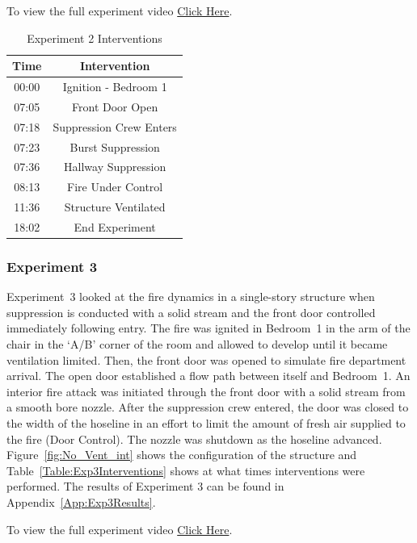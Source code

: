 \documentclass[12pt,oneside]{book}
\begin{document}
To view the full experiment video \href{https://player.vimeo.com/video/170510934?autoplay=1}{Click Here}.

\begin{table}[!ht]
	\centering
	\caption{Experiment 2 Interventions}
	\begin{tabular}{|c|c|} 
		\hline
		Time & Intervention \\ \hline \hline
		00:00 & Ignition - Bedroom 1 \\ \hline
		07:05 & Front Door Open \\ \hline
		07:18 & Suppression Crew Enters\\ \hline
		07:23 & Burst Suppression \\ \hline 
		07:36 & Hallway Suppression \\ \hline
		08:13 & Fire Under Control \\ \hline
		11:36 & Structure Ventilated \\ \hline
		18:02 & End Experiment\\ \hline
	\end{tabular}
	\label{Table:Exp2Interventions}
\end{table}

\FloatBarrier
\clearpage

\subsubsection{Experiment 3}
Experiment~3 looked at the fire dynamics in a single-story structure when suppression is conducted with a solid stream and the front door controlled immediately following entry. The fire was ignited in Bedroom~1 in the arm of the chair in the `A/B' corner of the room and allowed to develop until it became ventilation limited. Then, the front door was opened to simulate fire department arrival. The open door established a flow path between itself and Bedroom~1. An interior fire attack was initiated through the front door with a solid stream from a smooth bore nozzle. After the suppression crew entered, the door was closed to the width of the hoseline in an effort to limit the amount of fresh air supplied to the fire (Door Control). The nozzle was shutdown as the hoseline advanced. Figure~\ref{fig:No_Vent_int} shows the configuration of the structure and Table~\ref{Table:Exp3Interventions} shows at what times interventions were performed. The results of Experiment 3 can be found in Appendix~\ref{App:Exp3Results}.

To view the full experiment video \href{https://player.vimeo.com/video/170513516?autoplay=1}{Click Here}.
\end{document}
